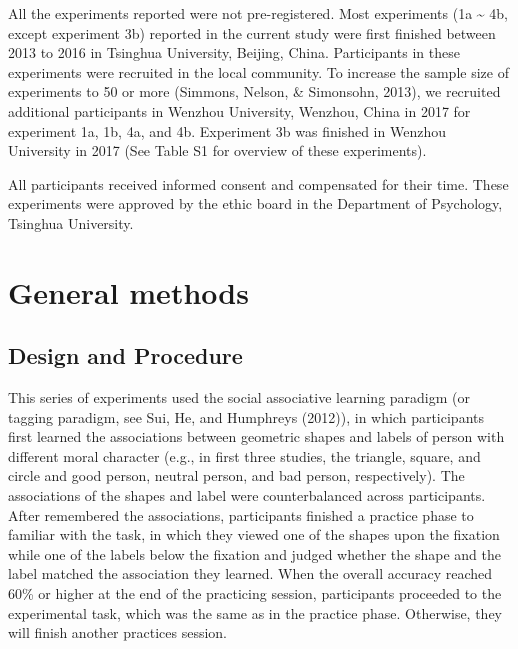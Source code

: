 \documentclass[
  man]{apa6}
\begin{document}
All the experiments reported were not pre-registered. Most experiments (1a \textasciitilde{} 4b, except experiment 3b) reported in the current study were first finished between 2013 to 2016 in Tsinghua University, Beijing, China. Participants in these experiments were recruited in the local community. To increase the sample size of experiments to 50 or more (Simmons, Nelson, \& Simonsohn, 2013), we recruited additional participants in Wenzhou University, Wenzhou, China in 2017 for experiment 1a, 1b, 4a, and 4b. Experiment 3b was finished in Wenzhou University in 2017 (See Table S1 for overview of these experiments).

All participants received informed consent and compensated for their time. These experiments were approved by the ethic board in the Department of Psychology, Tsinghua University.

\hypertarget{general-methods}{%
\section{General methods}\label{general-methods}}

\hypertarget{design-and-procedure}{%
\subsection{Design and Procedure}\label{design-and-procedure}}

This series of experiments used the social associative learning paradigm (or tagging paradigm, see Sui, He, and Humphreys (2012)), in which participants first learned the associations between geometric shapes and labels of person with different moral character (e.g., in first three studies, the triangle, square, and circle and good person, neutral person, and bad person, respectively). The associations of the shapes and label were counterbalanced across participants. After remembered the associations, participants finished a practice phase to familiar with the task, in which they viewed one of the shapes upon the fixation while one of the labels below the fixation and judged whether the shape and the label matched the association they learned. When the overall accuracy reached 60\% or higher at the end of the practicing session, participants proceeded to the experimental task, which was the same as in the practice phase. Otherwise, they will finish another practices session.
\end{document}
